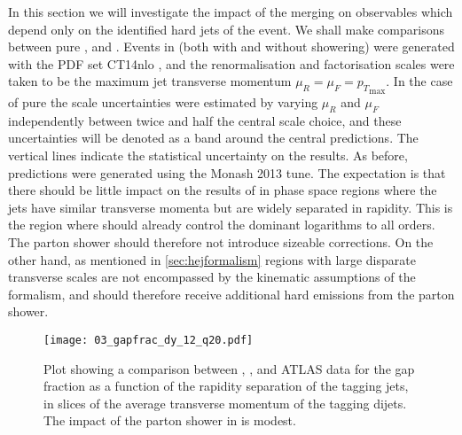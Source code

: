 In this section we will investigate the impact of the merging on
observables which depend only on the identified hard jets of the event. 
We shall make comparisons between pure \HEJ, \py and \HEJpy. Events in \HEJ 
(both with and without showering) were
generated with the PDF set CT14nlo \cite{Dulat:2015mca,Buckley:2014ana}, and 
the renormalisation and factorisation scales were taken to 
be the maximum jet transverse momentum $\mu_R=\mu_F = {p_T}_\mathrm{max}$.
In the case of pure \HEJ the scale uncertainties were estimated by varying 
$\mu_R$ and $\mu_F$ independently between twice and half the central scale choice,
and these uncertainties will be denoted as a band around the central predictions.
The vertical lines indicate the statistical uncertainty on the results. 
As before, \py predictions were generated using the Monash 2013 tune. The
expectation is that there should be little impact on the results of \HEJ in
phase space regions where the jets have similar transverse momenta but are widely
separated in rapidity. This is the region where \HEJ should already control
the dominant logarithms to all orders. The parton shower should therefore not
introduce sizeable corrections. On the other hand, as mentioned in \cref{sec:hejformalism}
regions with large disparate transverse scales are not encompassed by the kinematic assumptions
of the \HEJ formalism, and should therefore receive additional hard emissions from the parton
shower. 

\begin{figure}[t]
  \centering
     \texttt{[image: 03\_gapfrac\_dy\_12\_q20.pdf]}
  \caption{Plot showing a comparison between \HEJ, \py, \HEJpy  and ATLAS data \cite{Aad:2011jz} for
  the gap fraction as a function of the rapidity separation of the tagging jets, in slices of the average transverse momentum of the tagging dijets.
  The impact of the parton shower in \HEJpy is modest.}
  \label{fig:gapfrac}
\end{figure}


